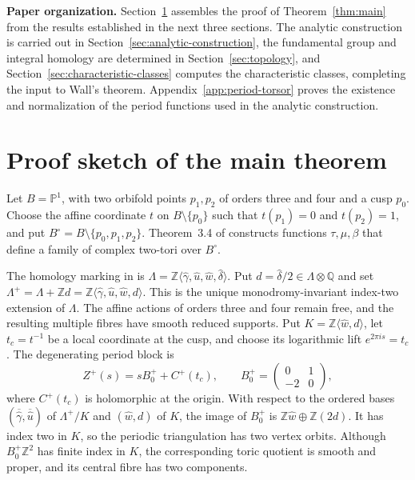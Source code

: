 \documentclass[11pt]{article}
\theoremstyle{definition}
\theoremstyle{remark}
\numberwithin{equation}{section}
\newcommand{\PP}{\mathbb P}
\newcommand{\ZZ}{\mathbb Z}
\begin{document}
\vspace{3pt}

\noindent\textbf{Paper organization.}
Section~\ref{sec:key-inputs} assembles the proof of
Theorem~\ref{thm:main} from the results established in the next three
sections.  The analytic construction is carried out in
Section~\ref{sec:analytic-construction}, the fundamental group and integral
homology are determined
in Section~\ref{sec:topology}, and Section~\ref{sec:characteristic-classes}
computes the characteristic classes, completing the input to Wall's theorem.
Appendix~\ref{app:period-torsor} proves the existence and normalization of
the period functions used in the analytic construction.

\section{Proof sketch of the main theorem}\label{sec:key-inputs}

Let $B=\PP^1$, with two orbifold points $p_1,p_2$ of orders three and
four and a cusp $p_0$.  Choose the affine coordinate $t$ on
$B\setminus\{p_0\}$ such that $t(p_1)=0$ and $t(p_2)=1$, and put
$B^\circ=B\setminus\{p_0,p_1,p_2\}$.  Theorem~3.4 of
\citet{Alpoge2026} constructs functions $\tau,\mu,\beta$ that define a
family of complex two-tori over $B^\circ$.

The homology marking in \citet[Section~2.1]{Alpoge2026} is
$\Lambda=\ZZ\langle\widehat\gamma,\widehat u,\widehat w,
\widehat\delta\rangle$.  Put
$d=\widehat\delta/2\in\Lambda\otimes\mathbb Q$ and set
$\Lambda^+=\Lambda+\ZZ d
=\ZZ\langle\widehat\gamma,\widehat u,\widehat w,d\rangle$.
This is the unique monodromy-invariant index-two extension of $\Lambda$.
The affine actions of orders three and four remain free, and the resulting
multiple fibres have smooth reduced supports.  Put
$K=\ZZ\langle\widehat w,d\rangle$, let $t_c=t^{-1}$ be a local
coordinate at the cusp, and choose its logarithmic lift
$e^{2\pi i s}=t_c$.  The degenerating period block is
\[
 Z^+(s)=sB_0^++C^+(t_c),
 \qquad
 B_0^+=\begin{pmatrix}0&1\\-2&0\end{pmatrix},
\]
where $C^+(t_c)$ is holomorphic at the origin.  With respect to the ordered
bases $(\overline{\widehat\gamma},\overline{\widehat u})$ of
$\Lambda^+/K$ and $(\widehat w,d)$ of $K$, the image of
$B_0^+$ is $\ZZ\widehat w\oplus\ZZ(2d)$.  It has index two in
$K$, so the periodic triangulation has two vertex orbits.  Although
$B_0^+\mathbb Z^2$ has finite index in $K$, the corresponding toric
quotient is smooth and proper, and its central fibre has two components.
\end{document}
